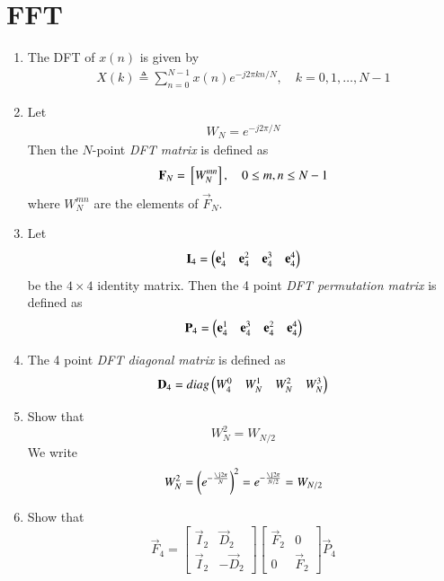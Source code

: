 \documentclass[journal,12pt,twocolumn]{IEEEtran}
\renewcommand\thesection{\arabic{section}}
\begin{document}
\section{FFT}
\begin{enumerate}[label=\arabic*.,ref=\thesection.\theenumi]
    \item The DFT of $x(n)$ is given by
    \begin{align}
        X(k) \triangleq \sum_{n=0}^{N-1} x(n) e^{-j 2 \pi k n / N}, \quad k=0,1, \ldots, N-1
    \end{align}
\item Let 
	\begin{align}
W_{N} = e^{-j2\pi/N} 
	\end{align}
		Then the $N$-point {\em DFT matrix} is defined as 
	\begin{align}
		\mathbf{F}_{N} = {}\left[W_{N}^{mn}\right], \quad 0 \le m,n \le N-1 
	\end{align}
	where $W_{N}^{mn}$ are the elements of $\vec{F}_{N}$.
\item Let 
	\begin{align}
		\mathbf{I}_4 = \begin{pmatrix}\mathbf{e}_4^{1} &\mathbf{e}_4^{2} &\mathbf{e}_4^{3} &\mathbf{e}_4^{4} \end{pmatrix}
	\end{align}
		be the $4\times 4$ identity matrix.  Then the 4 point {\em DFT permutation matrix} is defined as 
	\begin{align}
		\mathbf{P}_4 = \begin{pmatrix}\mathbf{e}_4^{1} &\mathbf{e}_4^{3} &\mathbf{e}_4^{2} &\mathbf{e}_4^{4} \end{pmatrix}
	\end{align}
\item The 4 point {\em DFT diagonal matrix} is defined as 
	\begin{align}
		\mathbf{D}_4 = diag\begin{pmatrix}W_{4}^{0} & W_{N}^{1} & W_{N}^{2} & W_{N}^{3}\end{pmatrix}
	\end{align}
\item Show that 
\begin{equation}
    W_{N}^{2}=W_{N/2}
\end{equation}
\solution We write
\begin{align}
	W_N^2 = \brak{e^{-\frac{\j2\pi}{N}}}^2 = e^{-\frac{\j2\pi}{N/2}} = W_{N/2}
\end{align}
    \item Show that 
\begin{equation}
	\vec{F}_{4}=
\begin{bmatrix}
	\vec{I}_{2} & \vec{D}_{2} \\
\vec{I}_{2} & -\vec{D}_{2}
\end{bmatrix}
\begin{bmatrix}
\vec{F}_{2} & 0 \\
0 & \vec{F}_{2}
\end{bmatrix}
\vec{P}_{4}
\end{equation}


\end{enumerate}
\end{document}
